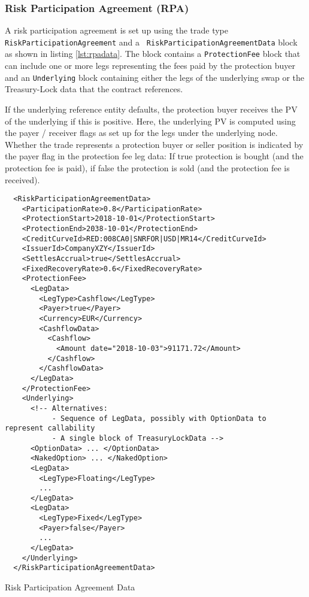\subsubsection{Risk Participation Agreement (RPA)}
\label{input:cr_rpa}

A risk participation agreement is set up using the trade type {\tt RiskParticipationAgreement} and a {\tt
  RiskParticipationAgreementData} block as shown in listing \ref{lst:rpadata}. The block contains a {\tt ProtectionFee}
block that can include one or more legs representing the fees paid by the protection buyer and an {\tt Underlying} block
containing either the legs of the underlying swap or the Treasury-Lock data that the contract references.

If the underlying reference entity defaults, the protection buyer receives the PV of the underlying if this is
positive. Here, the underlying PV is computed using the payer / receiver flags as set up for the legs under the
underlying node. Whether the trade represents a protection buyer or seller position is indicated by the payer flag in
the protection fee leg data: If true protection is bought (and the protection fee is paid), if false the protection is
sold (and the protection fee is received).

\begin{listing}[H]
\begin{verbatim}
  <RiskParticipationAgreementData>
    <ParticipationRate>0.8</ParticipationRate>
    <ProtectionStart>2018-10-01</ProtectionStart>
    <ProtectionEnd>2038-10-01</ProtectionEnd>
    <CreditCurveId>RED:008CA0|SNRFOR|USD|MR14</CreditCurveId>
    <IssuerId>CompanyXZY</IssuerId>
    <SettlesAccrual>true</SettlesAccrual>
    <FixedRecoveryRate>0.6</FixedRecoveryRate>
    <ProtectionFee>
      <LegData>
        <LegType>Cashflow</LegType>
        <Payer>true</Payer>
        <Currency>EUR</Currency>
        <CashflowData>
          <Cashflow>
            <Amount date="2018-10-03">91171.72</Amount>
          </Cashflow>
        </CashflowData>
      </LegData>
    </ProtectionFee>
    <Underlying>
      <!-- Alternatives:
           - Sequence of LegData, possibly with OptionData to represent callability
           - A single block of TreasuryLockData -->
      <OptionData> ... </OptionData>
      <NakedOption> ... </NakedOption>
      <LegData>
        <LegType>Floating</LegType>
        ...
      </LegData>
      <LegData>
        <LegType>Fixed</LegType>
        <Payer>false</Payer>
        ...
      </LegData>
    </Underlying>
  </RiskParticipationAgreementData>
\end{verbatim}
\caption{Risk Participation Agreement Data}
\label{lst:rpadata}
\end{listing}

